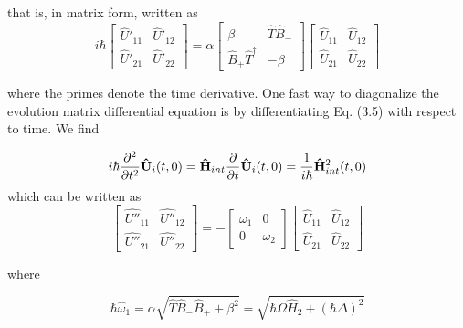 \documentclass[a4paper, 10pt]{article}
\numberwithin{equation}{section}
\begin{document}
\noindent
that is, in matrix form, written as
\begin{equation}
i\hbar \left [\begin{array}{cc}
      \hat{U}'_{11}   & \hat{U}'_{12}  \\
      \hat{U}'_{21}& \hat{U}'_{22}
    \end{array} \right] = \alpha \left[\begin{array}{cc}
     \beta    & \hat{T}\hat{B}_-  \\
      \hat{B}_+\hat{T}^\dagger   & -\beta 
    \end{array}\right] \left [\begin{array}{cc}
      \hat{U}_{11}   & \hat{U}_{12}  \\
    \hat{U}_{21} & \hat{U}_{22}
    \end{array} \right]
\end{equation} 

\noindent
where the primes denote the time derivative. One fast way to diagonalize the evolution
matrix differential equation is by differentiating Eq. (3.5) with respect to time. We find

\begin{equation}
    i\hbar\frac{\partial^2}{\partial t^2}{\bf \hat{U}}_i(t,0) = {\bf \hat{H}}_{int}\frac{\partial}{\partial t}{\bf\hat{U}}_i(t,0) = \frac{1}{i\hbar}{\bf \hat{H}}_{int}^2(t,0)
\end{equation}
\noindent
which can be written as
\begin{equation}
    \left [\begin{array}{cc}
   \hat{U''}_{11}  & \hat{U''}_{12} \\
    \hat{U''}_{21} & \hat{U''}_{22}
\end{array} \right] = -\left[\begin{array}{cc}
    \omega_1 & 0  \\
    0 & \omega_2
\end{array} \right] \left[\begin{array}{cc}
   \hat{U}_{11}  &  \hat{U}_{12} \\
    \hat{U}_{21} & \hat{U}_{22}
\end{array} \right]
\end{equation}

\noindent
where

\begin{equation}
    \hbar\hat{\omega}_1 = \alpha \sqrt{\hat{T}\hat{B}_-\hat{B}_+ +\beta^2} = \sqrt{\hbar\Omega \hat{H}_2 + (\hbar\Delta)^2} 
\end{equation}
\end{document}
